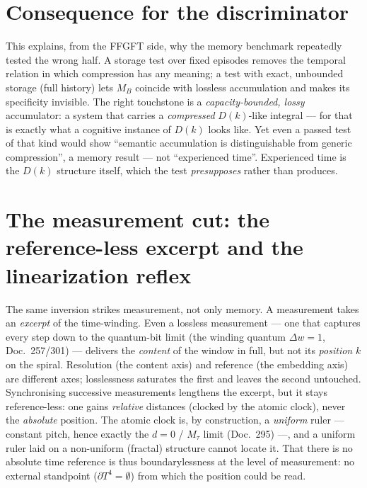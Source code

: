 \section{Consequence for the discriminator}

This explains, from the FFGFT side, why the memory benchmark repeatedly tested the wrong
half. A storage test over fixed episodes removes the temporal relation in which compression
has any meaning; a test with exact, unbounded storage (full history) lets $M_B$ coincide
with lossless accumulation and makes its specificity invisible. The right touchstone is a
\emph{capacity-bounded, lossy} accumulator: a system that carries a \emph{compressed}
$D(k)$-like integral --- for that is exactly what a cognitive instance of $D(k)$ looks like.
Yet even a passed test of that kind would show \enquote{semantic accumulation is
distinguishable from generic compression}, a memory result --- not \enquote{experienced
time}. Experienced time is the $D(k)$ structure itself, which the test \emph{presupposes}
rather than produces.

\section{The measurement cut: the reference-less excerpt and the linearization reflex}

The same inversion strikes measurement, not only memory. A measurement takes an
\emph{excerpt} of the time-winding. Even a lossless measurement --- one that captures every
step down to the quantum-bit limit (the winding quantum $\Delta w = 1$, Doc.~257/301) ---
delivers the \emph{content} of the window in full, but not its \emph{position} $k$ on the
spiral. Resolution (the content axis) and reference (the embedding axis) are different axes;
losslessness saturates the first and leaves the second untouched. Synchronising successive
measurements lengthens the excerpt, but it stays reference-less: one gains \emph{relative}
distances (clocked by the atomic clock), never the \emph{absolute} position. The atomic
clock is, by construction, a \emph{uniform} ruler --- constant pitch, hence exactly the
$d=0$ / $M_\tau$ limit (Doc.~295) ---, and a uniform ruler laid on a non-uniform (fractal)
structure cannot locate it. That there is no absolute time reference is thus boundarylessness
at the level of measurement: no external standpoint ($\partial T^4 = \emptyset$) from which
the position could be read.

